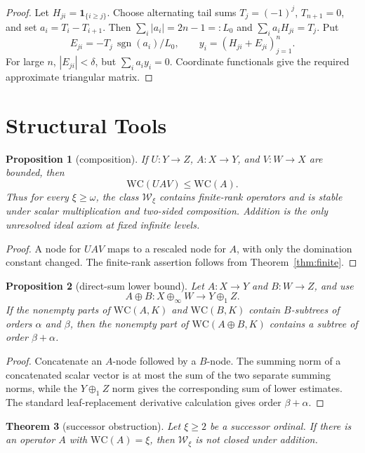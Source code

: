 \documentclass[11pt]{article}
\newtheorem{theorem}{Theorem}[section]
\newtheorem{proposition}[theorem]{Proposition}
\theoremstyle{definition}
\theoremstyle{remark}
\newcommand{\WC}{\mathrm{WC}}
\newcommand{\cW}{\mathcal W}
\begin{document}
\begin{proof}
Let \(H_{ji}=\mathbf 1_{\{i\geq j\}}\).  Choose alternating tail sums
\(T_j=(-1)^j\), \(T_{n+1}=0\), and set \(a_i=T_i-T_{i+1}\).  Then
\(\sum_i|a_i|=2n-1=:L_0\) and \(\sum_i a_iH_{ji}=T_j\).  Put
\[
E_{ji}=-T_j\,\operatorname{sgn}(a_i)/L_0,\qquad
y_i=(H_{ji}+E_{ji})_{j=1}^n.
\]
For large \(n\), \(|E_{ji}|<\delta\), but
\(\sum_i a_iy_i=0\).  Coordinate functionals give the required approximate
triangular matrix.
\end{proof}

\section{Structural Tools}

\begin{proposition}[composition]\label{prop:composition}
If \(U:Y\to Z\), \(A:X\to Y\), and \(V:W\to X\) are bounded, then
\[
   \WC(UAV)\leq\WC(A).
\]
Thus for every \(\xi\geq\omega\), the class \(\cW_\xi\) contains finite-rank
operators and is stable under scalar multiplication and two-sided
composition.  Addition is the only unresolved ideal axiom at fixed infinite
levels.
\end{proposition}

\begin{proof}
A node for \(UAV\) maps to a rescaled node for \(A\), with only the
domination constant changed.  The finite-rank assertion follows from
Theorem~\ref{thm:finite}.
\end{proof}

\begin{proposition}[direct-sum lower bound]\label{prop:direct-sum}
Let \(A:X\to Y\) and \(B:W\to Z\), and use
\[
A\oplus B:X\oplus_\infty W\to Y\oplus_1 Z.
\]
If the nonempty parts of \(\WC(A,K)\) and \(\WC(B,K)\) contain \(B\)-subtrees
of orders \(\alpha\) and \(\beta\), then the nonempty part of
\(\WC(A\oplus B,K)\) contains a subtree of order \(\beta+\alpha\).
\end{proposition}

\begin{proof}
Concatenate an \(A\)-node followed by a \(B\)-node.  The summing norm of a
concatenated scalar vector is at most the sum of the two separate summing
norms, while the \(Y\oplus_1 Z\) norm gives the corresponding sum of lower
estimates.  The standard leaf-replacement derivative calculation gives
order \(\beta+\alpha\).
\end{proof}

\begin{theorem}[successor obstruction]\label{thm:successor}
Let \(\xi\geq2\) be a successor ordinal.  If there is an operator \(A\) with
\(\WC(A)=\xi\), then \(\cW_\xi\) is not closed under addition.
\end{theorem}
\end{document}
